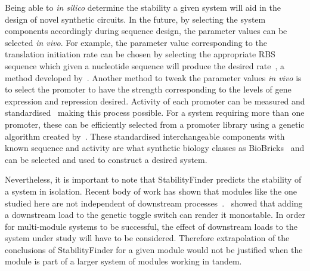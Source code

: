    
Being able to \textit{in silico} determine the stability a given system will aid in the design of novel synthetic circuits. In the future, by selecting the system components accordingly during sequence design, the parameter values can be selected \textit{in vivo}. For example, the parameter value corresponding to the translation initiation rate can be chosen by selecting the appropriate RBS sequence which given a nucleotide sequence will produce the desired rate~\autocite{Holtz:2010bm}, a method developed by~\textcite{Salis:2009gk}. Another method to tweak the parameter values \textit{in vivo} is to select the promoter to have the strength corresponding to the levels of gene expression and repression desired. Activity of each promoter can be measured and standardised~\autocite{Kelly:2009bj} making this process possible. For a system requiring more than one promoter, these can be efficiently selected from a promoter library using a genetic algorithm created by~\textcite{Wu:2011bq}. These standardised interchangeable components with known sequence and activity are what synthetic biology classes as BioBricks~\autocite{Kelly:2009bj,Canton:2008fv} and can be selected and used to construct a desired system.

 Nevertheless, it is important to note that StabilityFinder predicts the stability of a system in isolation. Recent body of work has shown that modules like the one studied here are not independent of downstream processes~\autocite{DelVecchio:2008gy, Ventura:2010ew, Jiang:2011ch, Lyons:2014iq}.~\textcite{Lyons:2014iq} showed that adding a downstream load to the genetic toggle switch can render it monostable. In order for multi-module systems to be successful, the effect of downstream loads to the system under study will have to be considered. Therefore extrapolation of the conclusions of StabilityFinder for a given module would not be justified when the module is part of a larger system of modules working in tandem.        
    
